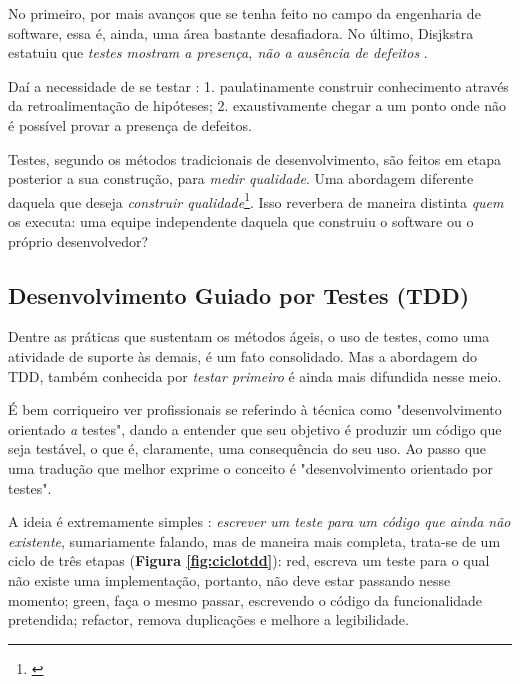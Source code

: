 \documentclass[12pt,a4paper,oneside,english,brazil]{article}
\begin{document}
    No primeiro, por mais avanços que se tenha feito no campo da engenharia de
    software, essa é, ainda, uma área bastante desafiadora. No último, Disjkstra
    estatuiu que \emph{testes mostram a presença, não a ausência de defeitos}
    \cite[p. 16]{Nato1969}.

    Daí a necessidade de se testar \cite[p. xxix-xxx]{Mezaros2007}: 1.
    paulatinamente construir conhecimento através da retroalimentação de
    hipóteses; 2. exaustivamente chegar a um ponto onde não é possível provar a
    presença de defeitos.

    Testes, segundo os métodos tradicionais de desenvolvimento, são feitos em
    etapa posterior a sua construção, para \emph{medir qualidade}. Uma abordagem
    diferente daquela que deseja \emph{construir qualidade}\footnote{\cite[p. 7]
    {FarcicGarcia2015}}. Isso reverbera de maneira
    distinta \emph{quem} os executa: uma equipe independente daquela que
    construiu o software ou o próprio desenvolvedor?


    \subsection{Desenvolvimento Guiado por Testes (TDD)}

      Dentre as práticas que sustentam os métodos ágeis, o uso de testes, como
      uma atividade de suporte às demais, é um fato consolidado. Mas a abordagem
      do TDD, também conhecida por \emph{testar primeiro} é ainda mais difundida
      nesse  meio.

      É bem corriqueiro ver profissionais se referindo à  técnica como
      "desenvolvimento orientado \emph{a} testes", dando a entender que seu
      objetivo é produzir um código que seja testável, o que é, claramente, uma
      consequência do seu uso. Ao passo que uma tradução que melhor exprime o
      conceito é "desenvolvimento orientado {por} testes".

      A ideia é extremamente simples \cite[p.1]{FreemanPryce2009}: \emph{escrever um
      teste para um código que ainda não existente}, sumariamente falando, mas
      de maneira mais completa, trata-se de um ciclo de três etapas
      (\textbf{Figura \ref{fig:ciclotdd}}): red,  escreva um teste para o qual
      não existe uma implementação, portanto, não deve estar passando nesse
      momento; green, faça o mesmo passar, escrevendo o código da funcionalidade
      pretendida; refactor, remova duplicações e melhore a legibilidade.
\end{document}
